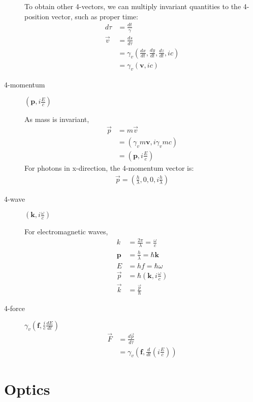 \documentclass[11pt]{article}
\newcommand{\ve}[1]{\ensuremath{\boldsymbol{#1}}}
\newcommand{\fve}[1]{\ensuremath{\vec{#1}}}
\begin{document}
\begin{multicols*}{3}
\begin{description}
To obtain other 4-vectors, we can multiply invariant quantities to the 4-position vector, such as proper time:
	\begin{align*}
	d\tau&=\frac{dt}{\gamma}\\
	\fve{v}&=\frac{ds}{d\tau}\\
	&=\gamma_v\left(\frac{dx}{dt},\frac{dy}{dt},\frac{dz}{dt},ic\right)\\
	&=\gamma_v(\ve{v},ic)
	\end{align*}
\item[4-momentum] $\left(\ve{p},i\frac{E}{c}\right)$

As mass is invariant, 
	\begin{align*}
	\fve{p}&=m\fve{v}\\
	&=(\gamma_vm\ve{v},i\gamma_vmc)\\
	&=\left(\ve{p},i\frac{E}{c}\right)
	\end{align*}
For photons in x-direction, the 4-momentum vector is:
	\begin{align*}
	\fve{p}=\left(\frac{h}{\lambda},0,0,i\frac{h}{\lambda}\right)
	\end{align*}
\item[4-wave] $\left(\ve{k},i\frac{\omega}{c}\right)$

For electromagnetic waves,
	\begin{align*}
	k&=\frac{2\pi}{\lambda}=\frac{\omega}{c}\\
	\ve{p}&=\frac{h}{\lambda}=\hbar\ve{k}\\
	E&=hf=\hbar\omega\\
	\fve{p}&=\hbar\left(\ve{k},i\frac{\omega}{c}\right)\\
	\fve{k}&=\frac{\fve{p}}{\hbar}
	\end{align*}
\item[4-force] $\gamma_v\left(\ve{f},\frac{i}{c}\frac{dE}{dt}\right)$
	\begin{align*}
	\fve{F}&=\frac{d\fve{p}}{d\tau}\\
	&=\gamma_v\left(\ve{f},\frac{d}{dt}\left(i\frac{E}{c}\right)\right)
	\end{align*}
\end{description}

\section{Optics}

\end{multicols*}
\end{document}
